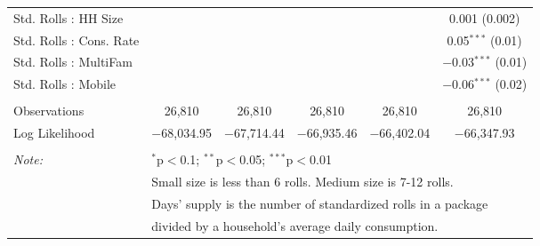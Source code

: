 \begin{table}[!htbp]
\begin{tabular}{@{\extracolsep{5pt}}lccccc}
  Std. Rolls : HH Size &  &  &  &  & 0.001 (0.002) \\ 
  Std. Rolls : Cons. Rate &  &  &  &  & 0.05$^{***}$ (0.01) \\ 
  Std. Rolls : MultiFam &  &  &  &  & $-$0.03$^{***}$ (0.01) \\ 
  Std. Rolls : Mobile &  &  &  &  & $-$0.06$^{***}$ (0.02) \\ 
 \hline \\[-1.8ex] 
Observations & 26,810 & 26,810 & 26,810 & 26,810 & 26,810 \\ 
Log Likelihood & $-$68,034.95 & $-$67,714.44 & $-$66,935.46 & $-$66,402.04 & $-$66,347.93 \\ 
\hline 
\hline \\[-1.8ex] 
\textit{Note:}  & \multicolumn{5}{l}{$^{*}$p$<$0.1; $^{**}$p$<$0.05; $^{***}$p$<$0.01} \\ 
 & \multicolumn{5}{l}{Small size is less than 6 rolls. Medium size is 7-12 rolls. } \\ 
 & \multicolumn{5}{l}{Days' supply is the number of standardized rolls in a package} \\ 
 & \multicolumn{5}{l}{divided by a household's average daily consumption.} \\ 
\end{tabular} 
\end{table} 
